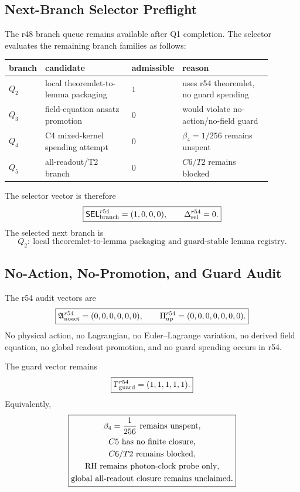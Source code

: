 \subsection{Next-Branch Selector Preflight}
\label{subsec:r54-next-branch-selector-preflight}

The r48 branch queue remains available after Q1 completion.  The selector evaluates the remaining branch families as follows:
\begin{center}
\begin{tabular}{@{}>{\raggedright\arraybackslash}p{0.08\linewidth}>{\raggedright\arraybackslash}p{0.33\linewidth}>{\raggedright\arraybackslash}p{0.14\linewidth}>{\raggedright\arraybackslash}p{0.34\linewidth}@{}}
branch & candidate & admissible & reason\\
\hline
\(Q_2\) & local theoremlet-to-lemma packaging & \(1\) & uses r54 theoremlet, no guard spending\\
\(Q_3\) & field-equation ansatz promotion & \(0\) & would violate no-action/no-field guard\\
\(Q_4\) & C4 mixed-kernel spending attempt & \(0\) & \(\beta_4=1/256\)  remains unspent\\
\(Q_5\) & all-readout/T2 branch & \(0\) & \(C6/T2\)  remains blocked\\
\end{tabular}
\end{center}
The selector vector is therefore
\[
\boxed{
\mathsf{SEL}_{\rm branch}^{r54}=(1,0,0,0),
\qquad
\Delta_{\rm sel}^{r54}=0.
}
\]
The selected next branch is
\[
\boxed{
Q_2:\ \text{local theoremlet-to-lemma packaging and guard-stable lemma registry.}
}
\]

\subsection{No-Action, No-Promotion, and Guard Audit}
\label{subsec:r54-no-action-no-promotion-guard-audit}

The r54 audit vectors are
\[
\boxed{
\mathfrak A_{\rm noact}^{r54}=(0,0,0,0,0,0),
\qquad
\Pi_{\rm np}^{r54}=(0,0,0,0,0,0,0).
}
\]
No physical action, no Lagrangian, no Euler--Lagrange variation, no derived field equation, no global readout promotion, and no guard spending occurs in r54.

The guard vector remains
\[
\boxed{
\Gamma_{\rm guard}^{r54}=(1,1,1,1,1).
}
\]
Equivalently,
\[
\boxed{
\begin{gathered}
\beta_4={1\over256}\text{ remains unspent},\\
C5\text{ has no finite closure},\\
C6/T2\text{ remains blocked},\\
\mathrm{RH}\text{ remains photon-clock probe only},\\
\text{global all-readout closure remains unclaimed}.
\end{gathered}
}
\]

